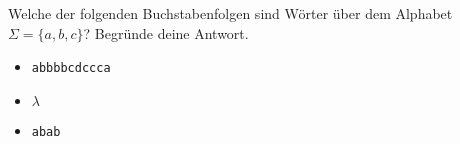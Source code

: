 %
%
Welche der folgenden Buchstabenfolgen sind Wörter über dem Alphabet \(\Sigma = \{a, b, c\}\)? Begründe deine Antwort.
\begin{itemize}[label=$\square$]
    \item \texttt{abbbbcdccca}
    \item \(\lambda\)
    \item \texttt{abab}
\end{itemize}
